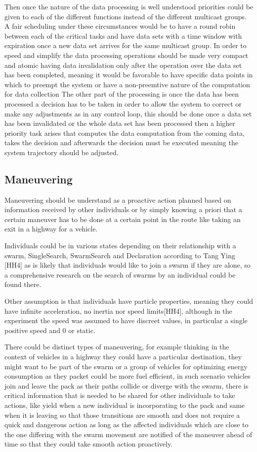 \documentclass[journal]{IEEEtran}
\begin{document}
\begin{itemize}
Then once the nature of the data processing is well understood priorities could be given to each of the different functions instead of the different multicast groups.
A fair scheduling under these circumstances would be to have a round robin between each of the critical tasks and have data sets with a time window with expiration once a new data set arrives for the same multicast group.
In order to speed and simplify the data processing operations should be made very compact and atomic having data invalidation only after the operation over the data set  has been completed, meaning it would be favorable to have specific data points in which to preempt the system or have a non-preemtive nature of the computation for data collection
The other part of the processing is once the data has been processed a decision has to be taken in order to allow the system to correct or make any adjustments as in any control loop, this should be done once a data set has been invalidated or the whole data set has been processed then a higher priority task arises that computes the data computation from the coming data, takes the decision and afterwards the decision must be executed meaning the system trajectory should be adjusted.

\subsection{Maneuvering}
Maneuvering should be understand as a proactive action planned based on information received by other individuals or by simply knowing a priori that a certain maneuver has to be done at a certain point in the route like taking an exit in a highway for a vehicle.

Individuals could be in various states depending on their relationship with a swarm, SingleSearch, SwarmSearch and Declaration according to Tang Ying [HH4] as is likely that individuals would like to join a swarm if they are alone, so a comprehensive research on the search of swarms by an individual could be found there.

Other assumption is that individuals have particle properties, meaning they could have infinite acceleration, no inertia nor speed limits[HH4], although in the experiment the speed was assumed to have discreet values, in particular a single positive speed and 0 or static.

There could be distinct types of maneuvering, for example thinking in the context of vehicles in a highway they could have a particular destination, they might want to be part of the swarm or a group of vehicles for optimizing energy consumption as they packet could be more fuel efficient, in such scenario vehicles join and leave the pack as their paths collide or diverge with the swarm, there is critical information that is needed to be shared for other individuals to take actions, like yield when a new individual is incorporating to the pack and same when it is leaving so that those transitions are smooth and does not require a quick and dangerous action as long as the affected individuals which are close to the one differing with the swarm movement are notified of the maneuver ahead of time so that they could take smooth action proactively.


\end{itemize}
\end{document}

